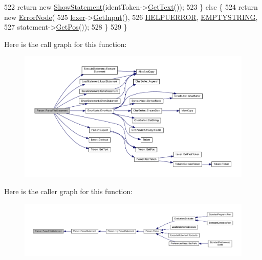 \begin{DoxyCode}
522         \textcolor{keywordflow}{return} \textcolor{keyword}{new} \hyperlink{classShowStatement}{ShowStatement}(identToken->\hyperlink{structToken_a15f1043de07ce8e452fbf115b85def71}{GetText}());
523     \} \textcolor{keywordflow}{else} \{
524         \textcolor{keywordflow}{return} \textcolor{keyword}{new} \hyperlink{classErrorNode}{ErrorNode}(
525                    \hyperlink{classParser_a8a8214126b0b0455e3ce375f3e9b20bf}{lexer}->\hyperlink{classLexer_a3032cbeb851294bccd61b722d9a86265}{GetInput}(),
526                    \hyperlink{text_8h_ab5098e75c70eb7127fefe6324edc117f}{HELPUERROR}, \hyperlink{platform_8h_a79ff1b9ff232b38c8b5600659e6bc7c2}{EMPTYSTRING},
527                    statement->\hyperlink{structToken_a5f93ea94940a6eeb060507e1da594599}{GetPos}());
528     \}
529 \}
\end{DoxyCode}


Here is the call graph for this function\+:
\nopagebreak
\begin{figure}[H]
\begin{center}
\leavevmode
\includegraphics[width=350pt]{d0/d40/classParser_a3c671b953bee260ed4eb3f5c30ededc2_cgraph}
\end{center}
\end{figure}




Here is the caller graph for this function\+:
\nopagebreak
\begin{figure}[H]
\begin{center}
\leavevmode
\includegraphics[width=350pt]{d0/d40/classParser_a3c671b953bee260ed4eb3f5c30ededc2_icgraph}
\end{center}
\end{figure}


